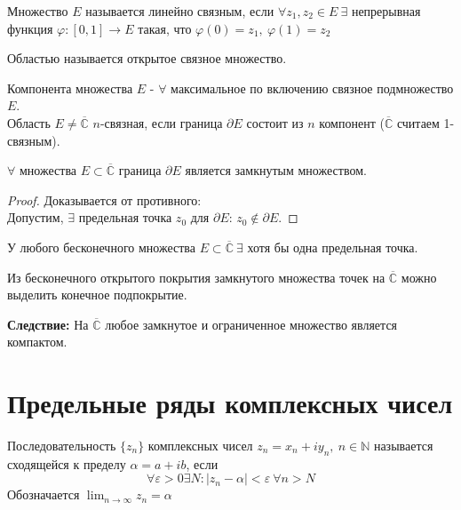 \begin{definition}
    Множество $E$ называется линейно связным, если $\forall z_1, z_2 \in E \ \exists$ непрерывная функция $\varphi: [0, 1] \to E$ такая, что $\varphi(0) = z_1, \ \varphi(1) = z_2$
\end{definition}

\begin{definition}
    Областью называется открытое связное множество.
\end{definition}

\begin{definition}
    Компонента множества $E$ - $\forall$ максимальное по включению связное подмножество $E$.\\
    Область $E \neq \overline{\mathbb{C}}$ $n$-связная, если граница $\partial E$ состоит из $n$ компонент ($\overline{\mathbb{C}}$ считаем 1-связным).
\end{definition}

\begin{statement}
    $\forall$ множества $E \subset \overline{\mathbb{C}}$ граница $\partial E$ является замкнутым множеством.
    \begin{proof}
        Доказывается от противного: \\
        Допустим, $\exists$ предельная точка $z_0$ для $\partial E$: $z_0 \notin \partial E$.
    \end{proof}
\end{statement}

\begin{theorem}
    У любого бесконечного множества $E \subset \overline{\mathbb{C}} \ \exists$ хотя бы одна предельная точка.
\end{theorem}

\begin{theorem}
    Из бесконечного открытого покрытия замкнутого множества точек на $\overline{\mathbb{C}}$ можно выделить конечное подпокрытие.

    \textbf{Следствие:} На $\overline{\mathbb{C}}$ любое замкнутое и ограниченное множество является компактом.
\end{theorem}

\section{Предельные ряды комплексных чисел}

\begin{definition}
    Последовательность $\{z_n\}$ комплексных чисел $z_n = x_n + i y_n, \ n \in \mathbb{N}$ называется сходящейся к пределу $\alpha = a + ib$, если
    \[\forall \varepsilon > 0 \exists N: \left| z_n - \alpha \right| < \varepsilon \ \forall n > N\]
    Обозначается $\lim_{n \to \infty} z_n = \alpha$

    
\end{definition}
    
